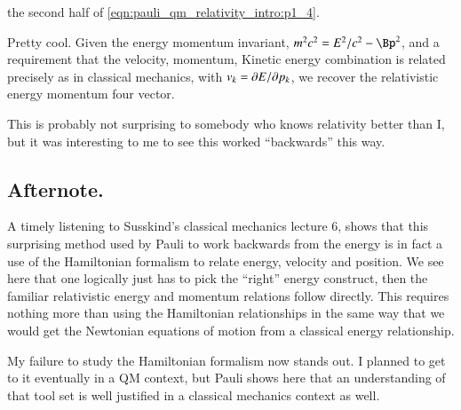 the second half of \ref{eqn:pauli_qm_relativity_intro:p1_4}.

Pretty cool.  Given the energy momentum invariant, $m^2 c^2 = E^2/c^2 - \Bp^2$, and a requirement that the velocity, momentum, Kinetic energy combination is related precisely as in classical mechanics, with $v_k = \PDi{p_k}{E}$, we
recover the relativistic energy momentum four vector.

This is probably not surprising to somebody who knows relativity better than I, but it was
interesting to me to see this worked ``backwards'' this way.

\subsection{Afternote. }

A timely listening to Susskind's classical mechanics lecture 6, shows that 
this surprising method used by Pauli to work backwards from the energy 
is in fact a use of the Hamiltonian formalism to relate energy, velocity
and position.  We see here that one logically just has to pick the ``right''
energy construct, then the familiar relativistic energy and momentum relations
follow directly.  This requires nothing more than using the Hamiltonian
relationships in the same way that we would get the Newtonian equations
of motion from a classical energy relationship.

My failure to study the Hamiltonian formalism now stands out.  I planned to 
get to it eventually in a QM context, but Pauli shows here that an understanding
of that tool set is well justified in a classical mechanics context as well.

%
%

%
